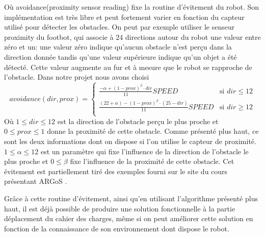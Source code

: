 \documentclass[a4paper,12pt]{report}
\begin{document}
Où avoidance(proximity sensor reading) fixe la routine d'évitement du robot. Son implémentation est très libre et peut fortement varier en fonction du capteur utilisé pour détecter les obstacles. On peut par exemple utiliser le senseur proximity du footbot, qui associe à 24 directions autour du robot une valeur entre zéro et un: une valeur zéro indique qu'aucun obstacle n'est perçu dans la direction donnée tandis qu'une valeur supérieure indique qu'un objet a été détecté. Cette valeur augmente au fur et à mesure que le robot se rapproche de l'obstacle.\cite{argosSite1} Dans notre projet nous avons choisi
\[avoidance(dir, prox)=
  \begin{cases}
      \frac{-\alpha +(1-prox)^{\beta}\cdot dir}{11}SPEED & \text{si }dir \leq 12\\
      \frac{(22+\alpha )-(1-prox)^{\beta}\cdot (25-dir)}{11}SPEED & \text{si }dir \geq 12\\
  \end{cases}
\]
Où $ 1 \leq dir \leq 12 $ est la direction de l'obstacle perçu le plus proche et \hbox{$0 \leq prox \leq 1$} donne la proximité de cette obstacle. Comme présenté plus haut, ce sont les deux informations dont on dispose si l'on utilise le capteur de proximité.  \(1 \leq \alpha \leq 12 \) est un paramètre qui fixe l'influence de la direction de l'obstacle le plus proche et \(0 \leq \beta \) fixe l'influence de la proximité de cette obstacle. Cet évitement est partiellement tiré des exemples fourni sur le site du cours présentant ARGoS \cite{argosSite1}.

Grâce à cette routine d'évitement, ainsi qu'en utilisant l'algorithme présenté plus haut, il est déjà possible de produire une solution fonctionnelle à la partie déplacement du cahier des charges, même si on peut améliorer cette solution en fonction de la connaissance de son environnement dont dispose le robot.
\end{document}
